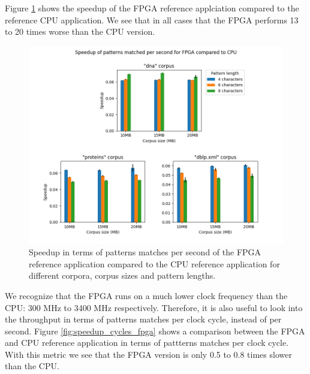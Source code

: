 Figure \ref{fig:speedup_fpga} shows the speedup of the FPGA reference applciation compared to the reference CPU application.
We see that in all cases that the FPGA performs 13 to 20 times worse than the CPU version.

\begin{figure}[H]
\centering
\includegraphics[width=1.0\textwidth]{figures/speedup_fpga.png}
\caption{Speedup in terms of patterns matches per second of the FPGA reference application compared to the CPU reference application for different corpora, corpus sizes and pattern lengths.}
\label{fig:speedup_fpga}
\end{figure}

We recognize that the FPGA runs on a much lower clock frequency than the CPU: 300 MHz to 3400 MHz respectively.
Therefore, it is also useful to look into the throughput in terms of patterns matches per clock cycle, instead of per second.
Figure \ref{fig:speedup_cycles_fpga} shows a comparison between the FPGA and CPU reference application in terms of pattterns matches per clock cycle.
With this metric we see that the FPGA version is only 0.5 to 0.8 times slower than the CPU.

